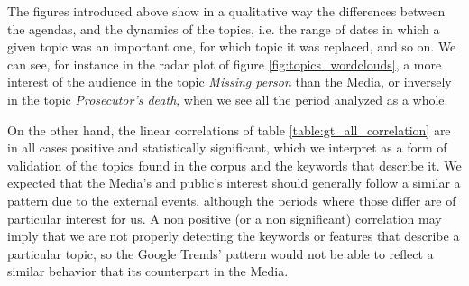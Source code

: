 

\par The figures introduced above show in a qualitative way the differences between the agendas, and the dynamics of the topics, i.e. the range of dates in which a given topic was an important one, for which topic it was replaced, and so on. We can see, for instance in the radar plot of figure \ref{fig:topics_wordclouds}, a more interest of the audience in the topic \emph{Missing person} than the Media, or inversely in the topic \emph{Prosecutor's death}, when we see all the period analyzed as a whole. 
\par On the other hand, the linear correlations of table \ref{table:gt_all_correlation} are in all cases positive and statistically significant, which we interpret as a form of validation of the topics found in the corpus and the keywords that describe it. 
We expected that the Media's and public's interest should generally follow a similar a pattern due to the external events, although the periods where those differ are of particular interest for us. 
A non positive (or a non significant) correlation may imply that we are not properly detecting the keywords or features that describe a particular topic, so the Google Trends' pattern would not be able to reflect a similar behavior that its counterpart in the Media.

